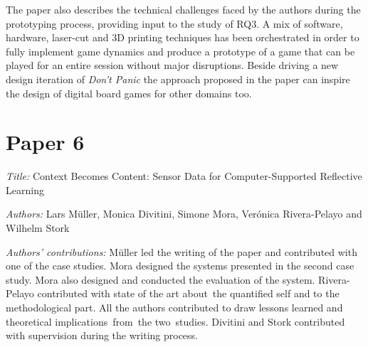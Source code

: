 The paper also describes the technical challenges faced by the authors during the prototyping process, providing input to the study of RQ3. A mix of software, hardware, laser-cut and 3D printing techniques has been orchestrated in order to fully implement game dynamics and produce a prototype of a game that can be played for an entire session without major disruptions. Beside driving a new design iteration of \emph{Don't Panic} the approach proposed in the paper can inspire the design of digital board games for other domains too.



\section[P6: Context Becomes Content: Sensor Data for Computer-Supported Reflective Learning]{Paper 6}\label{paper-6}

\emph{Title:} Context Becomes Content: Sensor Data for Computer-Supported Reflective Learning

\emph{Authors:} Lars Müller, Monica Divitini, Simone Mora, Verónica Rivera-Pelayo and Wilhelm Stork

\emph{Authors' contributions:} Müller led the writing of the paper and contributed with one of the case studies. Mora designed the systems presented in the second case study. Mora also designed and conducted the evaluation of the system. Rivera-Pelayo contributed with state of the art about~the quantified self and to the methodological part. All the authors contributed to draw lessons learned and theoretical implications~from~the two~studies. Divitini and Stork contributed with supervision during the writing process.

